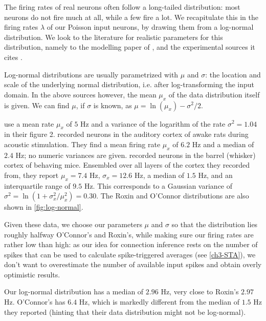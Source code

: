 The firing rates of real neurons often follow a long-tailed distribution: most neurons do not fire much at all, while a few fire a lot.\cite{Mizuseki2013PreconfiguredSkewedDistribution,Hromadka2008SparseRepresentationSounds,Shafi2007VariabilityNeuronalActivity} We recapitulate this in the firing rates $λ$ of our Poisson input neurons, by drawing them from a log-normal distribution. We look to the literature for realistic parameters for this distribution, namely to the modelling paper of , and the experimental sources it cites \cite{Hromadka2008SparseRepresentationSounds,OConnor2010NeuralActivityBarrel}.

Log-normal distributions are usually parametrized with $μ$ and $σ$: the location and scale of the underlying normal distribution, i.e. after log-transforming the input domain. In the above sources however, the mean $μ_x$ of the data distribution itself is given. We can find $μ$, if $σ$ is known, as $μ = \ln(μ_x) - σ^2 / 2$.

 use a mean rate $μ_x$ of $5$ Hz and a variance of the logarithm of the rate $σ^2 = 1.04$ in their figure 2.  recorded neurons in the auditory cortex of awake rats during acoustic stimulation. They find a mean firing rate $μ_x$ of $6.2$ Hz and a median of $2.4$ Hz; no numeric variances are given.  recorded neurons in the barrel (whisker) cortex of behaving mice. Ensembled over all layers of the cortex they recorded from, they report $μ_x = 7.4$ Hz, $σ_x = 12.6$ Hz, a median of $1.5$ Hz, and an interquartile range of $9.5$ Hz. This corresponds to a Gaussian variance of $σ^2 = \ln(1 + σ_x^2 / μ_x^2) = 0.30$. The Roxin and O'Connor distributions are also shown in \cref{fig:log-normal}.

Given these data, we choose our parameters $μ$ and $σ$ so that the distribution lies roughly halfway O'Connor's and Roxin's, while making sure our firing rates are rather low than high: as our idea for connection inference rests on the number of spikes that can be used to calculate spike-triggered averages (see \cref{ch3-STA}), we don't want to overestimate the number of available input spikes and obtain overly optimistic results.

Our log-normal distribution has a median of $2.96$ Hz, very close to Roxin's $2.97$ Hz. O'Connor's has $6.4$ Hz, which is markedly different from the median of $1.5$ Hz they reported (hinting that their data distribution might not be log-normal).

